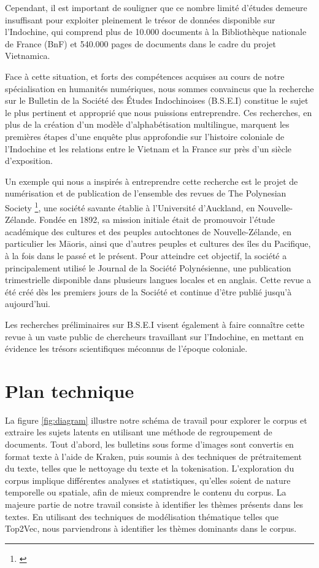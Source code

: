 Cependant, il est important de souligner que ce nombre limité d'études demeure insuffisant pour exploiter pleinement le trésor de données disponible sur l'Indochine, qui comprend plus de 10.000 documents à la Bibliothèque nationale de France (BnF) et 540.000 pages de documents dans le cadre du projet Vietnamica.

Face à cette situation, et forts des compétences acquises au cours de notre spécialisation en humanités numériques, nous sommes convaincus que la recherche sur le Bulletin de la Société des Études Indochinoises (B.S.E.I) constitue le sujet le plus pertinent et approprié que nous puissions entreprendre. Ces recherches, en plus de la création d'un modèle d'alphabétisation multilingue, marquent les premières étapes d'une enquête plus approfondie sur l'histoire coloniale de l'Indochine et les relations entre le Vietnam et la France sur près d'un siècle d'exposition.

Un exemple qui nous a inspirés à entreprendre cette recherche est le projet de numérisation et de publication de l'ensemble des revues de  	
The Polynesian Society  \footnote{\cite{contribu}}, une société savante établie à l'Université d'Auckland, en Nouvelle-Zélande. Fondée en 1892, sa mission initiale était de promouvoir l'étude académique des cultures et des peuples autochtones de Nouvelle-Zélande, en particulier les Māoris, ainsi que d'autres peuples et cultures des îles du Pacifique, à la fois dans le passé et le présent. Pour atteindre cet objectif, la société a principalement utilisé le Journal de la Société Polynésienne, une publication trimestrielle disponible dans plusieurs langues locales et en anglais. Cette revue a été créé dès les premiers jours de la Société et continue d'être publié jusqu'à aujourd'hui.

Les recherches préliminaires sur B.S.E.I visent également à faire connaître cette revue à un vaste public de chercheurs travaillant sur l'Indochine, en mettant en évidence les trésors scientifiques méconnus de l'époque coloniale.

\section{Plan technique}
La figure \ref{fig:diagram} illustre notre schéma de travail pour explorer le corpus et extraire les sujets latents en utilisant une méthode de regroupement de documents. Tout d'abord, les bulletins sous forme d'images sont convertis en format texte à l'aide de Kraken, puis soumis à des techniques de prétraitement du texte, telles que le nettoyage du texte et la tokenisation. L'exploration du corpus implique différentes analyses et statistiques, qu'elles soient de nature temporelle ou spatiale, afin de mieux comprendre le contenu du corpus. La majeure partie de notre travail consiste à identifier les thèmes présents dans les textes. En utilisant des techniques de modélisation thématique telles que Top2Vec, nous parviendrons à identifier les thèmes dominants dans le corpus.

